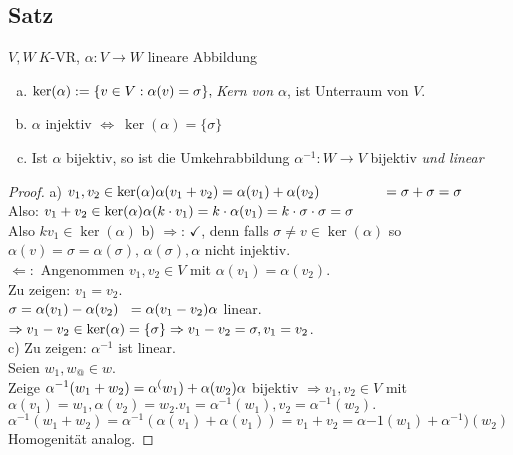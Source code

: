 \subsection{Satz}\label{sec:\thesubsection}
$V,W\ K$-VR, $\alpha: V \to W$ lineare Abbildung
\begin{enumerate}[a)]
\item $\ker(\alpha)  := \{ v \in V : \alpha(v) = \sigma \},\\
$\emph{Kern von $\alpha$}, ist Unterraum von $V$.
\item $\alpha$ injektiv $\Leftrightarrow\ \ker(\alpha) = \{\sigma\} $
\item Ist $\alpha$ bijektiv, so ist die Umkehrabbildung $\alpha^{-1}: W \to V$ bijektiv \emph{und linear}
\end{enumerate}
\begin{proof}a) $v_1,v_2 \in \ker(\alpha)\\
\alpha(v_1+v_2) = \alpha(v_1)+ \alpha(v_2)\\
\phantom{\alpha(v_1+v_2)} = \sigma + \sigma = \sigma$\\
Also: $v_1 + v_2 \in \ker(\alpha)\\
\alpha(k\cdot v_1) = k \cdot \alpha(v_1) = k \cdot \sigma \cdot \sigma = \sigma$\\
Also $kv_1 \in \ker(\alpha)$
b) $\Rightarrow$: $\checkmark$, denn falls $\sigma \ne v \in \ker(\alpha)$ so $\alpha(v) = \sigma = \alpha(\sigma),\,\alpha(\sigma), \alpha$ nicht injektiv. \Lightning\\
$\Leftarrow:$ Angenommen $v_1,v_2 \in V$ mit $\alpha(v_1) = \alpha(v_2)$.\\
Zu zeigen: $v_1 = v_2$.\\
$\sigma = \alpha(v_1) - \alpha(v_2)\\
\phantom\sigma = \alpha(v_1 - v_2)\\
\alpha$ linear.\\
$\Rightarrow v_1 - v_2 \in \ker(\alpha) = \{ \sigma \}\\
\Rightarrow v_1 - v_2 = \sigma , v_1 = v_2$.\\
c) Zu zeigen: $\alpha^{-1}$ ist linear.\\
Seien $w_1,w_@ \in w$.\\
Zeige $\alpha^{-1}(w_1 + w_2) = \alpha^(w_1) + \alpha(w_2)\\
\alpha$ bijektiv $\Rightarrow v_1,v_2 \in V$ mit $\alpha(v_1) = w_1, \alpha(v_2) = w_2. v_1 = \alpha^{-1}(w_1) ,v_2 = \alpha^{-1}(w_2).$\\
$\alpha^{-1}(w_1 + w_2) = \alpha^{-1}(\alpha(v_1)+ \alpha(v_1)) = v_1 + v_2 = \alpha{-1}(w_1)+ \alpha^{-1})(w_2)$\\
Homogenität analog.
\end{proof}
